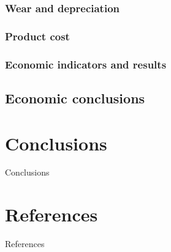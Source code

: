 \documentclass[12pt,a4paper]{report}
\begin{document}
\subsection{Wear and depreciation}
\subsection{Product cost}
\subsection{Economic indicators and results}
\section{Economic conclusions}

\chapter*{Conclusions}
Conclusions

\chapter*{References}
References
\end{document}
